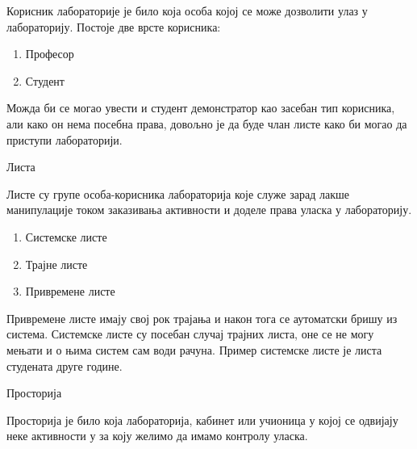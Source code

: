\documentclass[a4paper, 12pt, diplomski]{etfcyr}
\makeatletter
\newcommand{\indentfirstparagraphon}{
    \renewenvironment{justify}{%
    	\trivlist
    	\justifying
    	\itemindent\JustifyingParindent
    	\item\relax
    }{
        \endtrivlist
    }
}
\gdef\tshortstack{\@ifnextchar[\@tshortstack{\@tshortstack[c]}}
\let\@tshortstack\@shortstack
\makeatother
\begin{document}
\begin{labeling}{\smash{\tshortstack[l]{Корисник\\лабораторије}}}
\begin{justify}
                \end{justify}


            \item[\smash{\tshortstack[l]{Корисник\\лабораторије}}]
                \begin{justify}
                    Корисник лабораторије је било која особа којој се може дозволити улаз у лабораторију. Постоје две врсте корисника:
                    \begin{enumerate}[noitemsep]
                        \item Професор
                        \item Студент
                    \end{enumerate}
                    Можда би се могао увести и студент демонстратор као засебан тип корисника, али како он нема посебна права, довољно је да буде члан листе како би могао да приступи лабораторији.
                \end{justify}
            
            \item [Листа]
                \begin{justify}
                    Листе су групе особа-корисника лабораторија које служе зарад лакше манипулације током заказивања активности и доделе права уласка у лабораторију.
                    \begin{enumerate}[noitemsep]
                        \item Системске листе
                        \item Трајне листе
                        \item Привремене листе
                    \end{enumerate}
                    Привремене листе имају свој рок трајања и након тога се аутоматски бришу из система. Системске листе су посебан случај трајних листа, оне се не могу мењати и о њима систем сам води рачуна. Пример системске листе је листа студената друге године.
                \end{justify}
            
            \item [Просторија]
                \begin{justify}
                    Просторија је било која лабораторија, кабинет или учионица у којој се одвијају неке активности у за коју желимо да имамо контролу уласка.
                \end{justify}
            
            \indentfirstparagraphon
    	\end{labeling}
        
\end{document}
